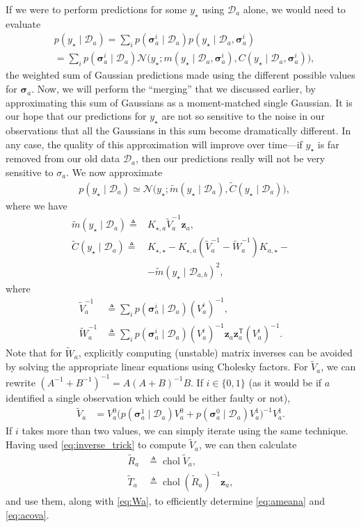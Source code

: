 \documentclass{article}
\newcommand{\given}{\ensuremath{\mid}}
\newcommand{\cm}[1]{\ensuremath{\mathcal{#1}}}
\newcommand{\bm}[1]{\ensuremath{\mathbf{#1}}}
\newcommand{\data}{\ensuremath{\cm{D}}}
\newcommand{\vect}[1]{\bm{#1}}
\newcommand{\vz}{\vect{z}}
\newcommand{\vs}{\vect{\sigma}}
\newcommand{\amean}[2]{\tilde{{m}}(#1 \given #2 )}
\newcommand{\acov}[2]{\tilde{{C}}(#1 \given #2 )}
\newcommand{\p}[2]{p(#1 \given #2 )}
\newcommand{\fPr}{p}
\newcommand{\Prob}[2]{\fPr(#1 \given #2 )}
\newcommand{\mean}[2]{{m}(#1 \given #2 )}
\newcommand{\cov}[2]{{C}(#1 \given #2 )}
\newcommand{\st}{_{\star}}
\newcommand{\tr}{\ensuremath{\mathsf{T}}}
\newcommand{\defequal}{\triangleq}
\DeclareMathOperator{\chol}{chol}
\begin{document}
If we were to perform predictions for some $y\st$ using $\data_a$
alone, we would need to evaluate
\begin{align*}
&\p{y\st}{\data_{a}} = \sum_{i} \Prob{\vs^i_{a}}{\data_a} \p{y\st}{\data_a, \vs^{i}_{a}}\nonumber\\
&=\sum_{i} \Prob{\vs^i_{a}}{\data_a} \cm{N}\bigl(y\st; \mean{y\st}{\data_a, \vs^{i}_{a}}, \cov{y\st}{\data_a, \vs^{i}_{a}}\bigr),
\end{align*}
the weighted sum of Gaussian predictions made using the different
possible values for $\vs_{a}$.  Now, we will perform the ``merging''
that we discussed earlier, by approximating this sum of Gaussians as a
moment-matched single Gaussian. It is our hope that our predictions
for $y\st$ are not so sensitive to the noise in our observations that
all the Gaussians in this sum become dramatically different. In any
case, the quality of this approximation will improve over time---if
$y\st$ is far removed from our old data $\data_a$, then our
predictions really will not be very sensitive to $\sigma_a$. We now
approximate
\begin{align*}
 &\p{y\st}{\data_{a}} \simeq \cm{N}\bigl(y\st; \amean{y\st}{\data_a}, \acov{y\st}{\data_a}\bigr),\label{eq:pya}
\end{align*}
where we have
\begin{align}
\amean{y\st}{\data_{a}} \defequal {}& K_{\star,a} \tilde{V}_a^{-1} \vz_a,\label{eq:ameana}\\
\acov{y\st}{\data_{a}}
\defequal {}& K_{\star,\star} - K_{\star,a}(\tilde{V}_a^{-1}-\tilde{W}_a^{-1})K_{a,\star} - \nonumber\\
& - \amean{y\st}{\data_{a,b}}^2 ,\label{eq:acova}
\end{align}
where
\begin{align}
 \tilde{V}_a^{-1}  & \defequal \sum_i \Prob{\vs^i_{a}}{\data_a} (V_a^i)^{-1},\nonumber\\
 \tilde{W}_a^{-1} & \defequal \sum_i \Prob{\vs^i_{a}}{\data_a} (V_a^i)^{-1}\vz_a \vz_a^\tr (V_a^i)^{-1}.\label{eq:Wa}
\end{align}
Note that for $\tilde{W}_a$, explicitly computing (unstable) matrix
inverses can be avoided by solving the appropriate linear equations
using Cholesky factors.  For $\tilde{V}_a$, we can rewrite
$(A^{-1}+B^{-1})^{-1} = A (A+B)^{-1} B$. If $i\in\{0,1\}$ (as it would
be if $a$ identified a single observation which could be either faulty
or not),
\begin{align} \label{eq:inverse_trick}
\tilde{V}_a & = V^0_a\bigl(
\Prob{\vs^1_{a}}{\data_a} V^0_a 
+ 
\Prob{\vs^0_{a}}{\data_a} V^1_a
\bigr)^{-1}V^1_a.
\end{align}
If $i$ takes more than two values, we can simply iterate using the
same technique. Having used \eqref{eq:inverse_trick} to compute
$\tilde{V}_a$, we can then calculate
\begin{align*}
 \tilde{R}_a & \defequal \chol \tilde{V}_a \label{eq:Ra}, \\
 \tilde{T}_a & \defequal \chol (\tilde{R}_a)^{-1} \vz_a \label{eq:Ta},
\end{align*}
and use them, along with \eqref{eq:Wa}, to efficiently determine
\eqref{eq:ameana} and \eqref{eq:acova}.
\end{document}
